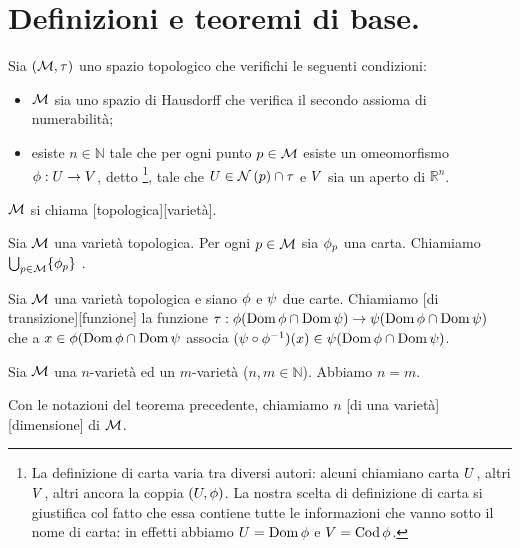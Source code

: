 \section{Definizioni e teoremi di base.}
\label{VarietaTopologiche_DefinizioniETeoremiDiBase}
\begin{Definition}
	Sia $(\mathcal{M},\tau)$ uno spazio topologico che verifichi le seguenti condizioni:
	\begin{itemize}
		\item $\mathcal{M}$ sia uno spazio di Hausdorff che verifica il secondo assioma di numerabilit\`a;
		\item esiste $n \in \mathbb{N}$ tale che per ogni punto $p \in \mathcal{M}$ esiste un omeomorfismo $\phi: U \rightarrow V$, detto \footnote{La definizione di carta varia tra diversi autori: alcuni chiamiano carta $U$, altri $V$, altri ancora la coppia $(U,\phi)$. La nostra scelta di definizione di carta si giustifica col fatto che essa contiene tutte le informazioni che vanno sotto il nome di carta: in effetti abbiamo $U = \operatorname{Dom}{\phi}$ e $V = \operatorname{Cod}{\phi}$.}, tale che $\Open \in \Neighborhoods{p} \cap \Topology$ e $V$ sia un aperto di $\mathbb{R}^n$.
	\end{itemize}
	$\mathcal{M}$ si chiama [topologica][variet\`a].
\end{Definition}
\begin{Definition}
	Sia $\mathcal{M}$ una variet\`a topologica. Per ogni $p \in \mathcal{M}$ sia $\phi_p$ una carta. Chiamiamo $\bigcup_{p \in \mathcal{M}} \lbrace \phi_p \rbrace$ .
\end{Definition}
\begin{Definition}
	Sia $\mathcal{M}$ una variet\`a topologica e siano $\phi$ e $\psi$ due carte. Chiamiamo [di transizione][funzione] la funzione $\tau: \phi(\operatorname{Dom}{\phi} \cap \operatorname{Dom}{\psi}) \rightarrow \psi(\operatorname{Dom}{\phi} \cap \operatorname{Dom}{\psi})$ che a $x \in \phi(\operatorname{Dom}{\phi} \cap \operatorname{Dom}{\psi}$ associa $(\psi \circ \phi^{-1})(x) \in \psi(\operatorname{Dom}{\phi} \cap \operatorname{Dom}{\psi})$.
\end{Definition}
\begin{Theorem}
	Sia $\mathcal{M}$ una $n$-variet\`a ed un $m$-variet\`a ($n, m \in \mathbb{N}$). Abbiamo $n = m$.
\end{Theorem}
\begin{Definition}
	Con le notazioni del teorema precedente, chiamiamo $n$ [di una variet\`a][dimensione] di $\mathcal{M}$.
\end{Definition}
